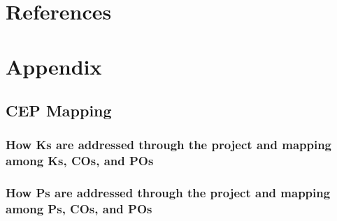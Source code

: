 \documentclass[10pt,a4paper]{extarticle}
\begin{document}
\section{References}


\pagebreak
\section*{Appendix}
\subsection*{CEP Mapping}

\subsubsection*{How Ks are addressed through the project and mapping among Ks, COs, and POs}

\subsubsection*{How Ps are addressed through the project and mapping among Ps, COs, and POs}
\end{document}
